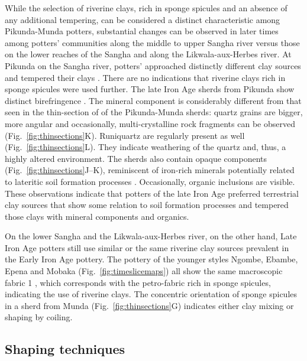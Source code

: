 \documentclass[smallextended,natbib]{svjour3}       %
\begin{document}
While the selection of riverine clays, rich in sponge spicules and an absence of any additional tempering, can be considered a distinct characteristic among Pikunda-Munda potters, substantial changes can be observed in later times among potters' communities along the middle to upper Sangha river versus those on the lower reaches of the Sangha and along the Likwala-aux-Herbes river. At Pikunda on the Sangha river, potters' approached distinctly different clay sources and tempered their clays \citep{Seidensticker.2016b,Seidensticker.2020}. There are no indications that riverine clays rich in sponge spicules were used further. The late Iron Age sherds from Pikunda show distinct birefringence \citep[b-fabric; Fig.~\ref{fig:thinsections}K--L;][131--141]{Stoops.2021}. The mineral component is considerably different from that seen in the thin-section of of the Pikunda-Munda sherds: quartz grains are bigger, more angular and occasionally, multi-crystalline rock fragments can be observed (Fig.~\ref{fig:thinsections}K). Runiquartz \citep[673 Fig.~6]{Marcelino.2018} are regularly present as well (Fig.~\ref{fig:thinsections}L). They indicate weathering of the quartz and, thus, a highly altered environment. The sherds also contain opaque components (Fig.~\ref{fig:thinsections}J--K), reminiscent of iron-rich minerals potentially related to lateritic soil formation processes \citep[351--352]{Scheffer.2010}. Occasionally, organic inclusions are visible. These observations indicate that potters of the late Iron Age preferred terrestrial clay sources that show some relation to soil formation processes and tempered those clays with mineral components and organics.

On the lower Sangha and the Likwala-aux-Herbes river, on the other hand, Late Iron Age potters still use similar or the same riverine clay sources prevalent in the Early Iron Age pottery. The pottery of the younger styles Ngombe, Ebambe, Epena and Mobaka (Fig.~\ref{fig:timeslicemaps}) all show the same macroscopic fabric 1 \citep[69 Tab.~12]{Seidensticker.2021e}, which corresponds with the petro-fabric rich in sponge spicules, indicating the use of riverine clays. The concentric orientation of sponge spicules in a sherd from Munda (Fig.~\ref{fig:thinsections}G) indicates either clay mixing or shaping by coiling.

\subsection{Shaping techniques}
\end{document}
